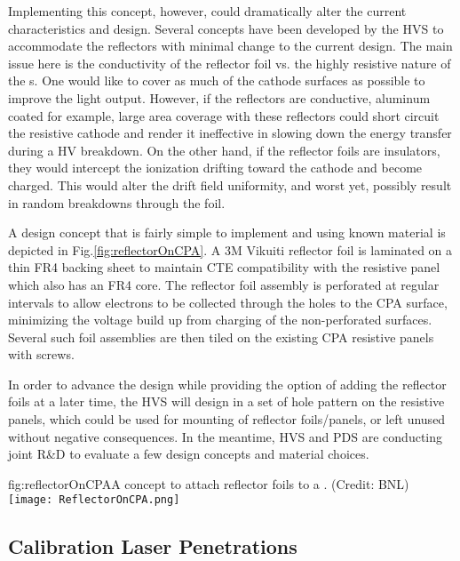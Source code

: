 Implementing this concept, however, could dramatically alter the current  characteristics and design.  Several concepts have been developed by the HVS to accommodate the reflectors with minimal change to the current  design.  The main issue here is the conductivity of the reflector foil vs. the highly resistive nature of the s.  One would like to cover as much of the cathode surfaces as possible to improve the light output.  However, if the reflectors are conductive, aluminum coated for example, large area coverage with these reflectors could short circuit the resistive cathode and render it ineffective in slowing down the energy transfer during a HV breakdown.  On the other hand, if the reflector foils are insulators, they would intercept the ionization drifting toward the cathode and become charged.  This would alter the drift field uniformity, and worst yet, possibly result in random breakdowns through the foil.

A design concept that is fairly simple to implement and using known material is depicted in Fig.\ref{fig:reflectorOnCPA}.  A 3M Vikuiti reflector foil is laminated on a thin FR4 backing sheet to maintain CTE compatibility with the resistive  panel which also has an FR4 core. The reflector foil assembly is perforated at regular intervals to allow electrons to be collected through the holes to the CPA surface, minimizing the voltage build up from charging of the non-perforated surfaces.  Several such foil assemblies are then tiled on the existing CPA resistive panels with screws.

In order to advance the  design while providing the option of adding the reflector foils at a later time, the HVS will design in a set of hole pattern on the  resistive panels, which could be used for mounting of reflector foils/panels, or left unused without negative consequences. In the meantime, HVS and PDS are conducting joint R\&D to evaluate a few design concepts and material choices. 

\begin{dunefigure}{fig:reflectorOnCPA}{A concept to attach reflector foils to a . (Credit: BNL)}
\texttt{[image: ReflectorOnCPA.png]}
\end{dunefigure}

\subsection{Calibration Laser Penetrations}

